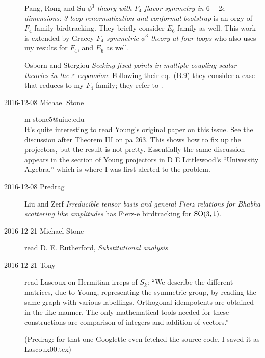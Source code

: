 \begin{description}
Pang, Rong  and Su {\em {$\phi^3$} theory with {$F_4$} flavor
symmetry in {$6-2\epsilon$} dimensions: 3-loop renormalization and conformal
bootstrap} is an orgy of $F_4$-family birdtracking. They briefly consider
$E_6$-family as well.
This work is extended by
Gracey {\em {$F_4$} symmetric {$\phi^3$} theory at four
loops} who also uses my results for $F_4$, and $E_6$ as well.

Osborn and Stergiou {\em Seeking fixed points in multiple
coupling scalar theories in the $\varepsilon$ expansion}:
Following their eq.~(B.9) they consider a case that reduces to my $F_4$
family; they refer to .

\item[2016-12-08 Michael Stone] m-stone5@uiuc.edu
\\
It's quite interesting to read Young's original paper on this
issue. See the discussion after Theorem III on pa 263. This shows how to fix
up the projectors, but the result is not pretty. Essentially the same
discussion appears in the section of Young projectors in D E Littlewood's
``University Algebra,'' which is where I was first alerted to the problem.

\item[2016-12-08 Predrag]
Liu and Zerf {\em Irreducible tensor basis and general {Fierz}
relations for {Bhabha} scattering like amplitudes} has Fierz-e birdtracking for
$\textrm{SO}(3,1)$.

\item[2016-12-21 Michael Stone] read
D. E. Rutherford, {\em Substitutional analysis}

\item[2016-12-21 Tony] read Lascoux on Hermitian irreps of
$S_k$: ``We describe the different matrices, due to Young, representing
the symmetric group, by reading the same graph with various labellings.
Orthogonal idempotents are obtained in the like manner. The only
mathematical tools needed for these constructions are comparison of
integers and addition of vectors.''

(Predrag: for that one Googlette even fetched the source code, I saved it as
Lascoux00.tex)


\end{description}


\printbibliography[heading=subbibintoc,title={References}]
